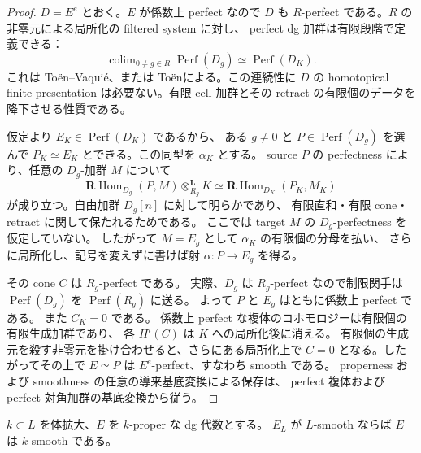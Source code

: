 \begin{proof}
\(D=E^e\) とおく。\(E\) が係数上 perfect なので \(D\) も
\(R\)-perfect である。\(R\) の非零元による局所化の filtered system に対し、
perfect dg 加群は有限段階で定義できる：
\[
 \mathop{\mathrm{colim}}_{0\ne g\in R}\operatorname{Perf}(D_g)
 \simeq \operatorname{Perf}(D_K).
\]
これは To\"en--Vaqui\'e\cite[Lemma~2.10]{ToenVaquieObjects}、または
To\"en\cite[事実 F4]{ToenDefinitionRings}による。この連続性に \(D\) の homotopical finite presentation
は必要ない。有限 cell 加群とその retract の有限個のデータを降下させる性質である。

仮定より \(E_K\in\operatorname{Perf}(D_K)\) であるから、
ある \(g\ne0\) と \(P\in\operatorname{Perf}(D_g)\) を選んで
\(P_K\simeq E_K\) とできる。この同型を \(\alpha_K\) とする。
source \(P\) の perfectness により、任意の \(D_g\)-加群 \(M\) について
\[
 \mathbf R\operatorname{Hom}_{D_g}(P,M)\otimes_{R_g}^{\mathbf L}K
 \simeq
 \mathbf R\operatorname{Hom}_{D_K}(P_K,M_K)
\]
が成り立つ。自由加群 \(D_g[n]\) に対して明らかであり、
有限直和・有限 cone・retract に関して保たれるためである。
ここでは target \(M\) の \(D_g\)-perfectness を仮定していない。
したがって \(M=E_g\) として \(\alpha_K\) の有限個の分母を払い、
さらに局所化し、記号を変えずに書けば射
\(\alpha:P\longrightarrow E_g\) を得る。

その cone \(C\) は \(R_g\)-perfect である。
実際、\(D_g\) は \(R_g\)-perfect なので制限関手は
\(\operatorname{Perf}(D_g)\) を \(\operatorname{Perf}(R_g)\) に送る。
よって \(P\) と \(E_g\) はともに係数上 perfect である。
また \(C_K=0\) である。
係数上 perfect な複体のコホモロジーは有限個の有限生成加群であり、
各 \(H^i(C)\) は \(K\) への局所化後に消える。
有限個の生成元を殺す非零元を掛け合わせると、さらにある局所化上で
\(C=0\) となる。したがってその上で \(E\simeq P\) は
\(E^e\)-perfect、すなわち smooth である。
properness および smoothness の任意の導来基底変換による保存は、
perfect 複体および perfect 対角加群の基底変換から従う。
\end{proof}

\begin{lemma}[体拡大からの降下]
\label{lem:dg-smooth-field-descent}
\(k\subset L\) を体拡大、\(E\) を \(k\)-proper な dg 代数とする。
\(E_L\) が \(L\)-smooth ならば \(E\) は \(k\)-smooth である。
\end{lemma}

